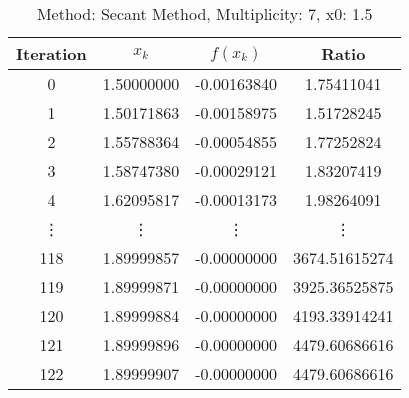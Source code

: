 \begin{table}
\centering
\caption{Method: Secant Method, Multiplicity: 7, x0: 1.5}
\label{tab:table_Secant_Method_7_1_5}
\begin{tabular}{c c c c}
\toprule
Iteration &      $x_k$ &    $f(x_k)$ &         Ratio \\
\midrule
        0 & 1.50000000 & -0.00163840 &    1.75411041 \\
        1 & 1.50171863 & -0.00158975 &    1.51728245 \\
        2 & 1.55788364 & -0.00054855 &    1.77252824 \\
        3 & 1.58747380 & -0.00029121 &    1.83207419 \\
        4 & 1.62095817 & -0.00013173 &    1.98264091 \\
   \vdots &     \vdots &      \vdots &        \vdots \\
      118 & 1.89999857 & -0.00000000 & 3674.51615274 \\
      119 & 1.89999871 & -0.00000000 & 3925.36525875 \\
      120 & 1.89999884 & -0.00000000 & 4193.33914241 \\
      121 & 1.89999896 & -0.00000000 & 4479.60686616 \\
      122 & 1.89999907 & -0.00000000 & 4479.60686616 \\
\bottomrule
\end{tabular}
\end{table}
